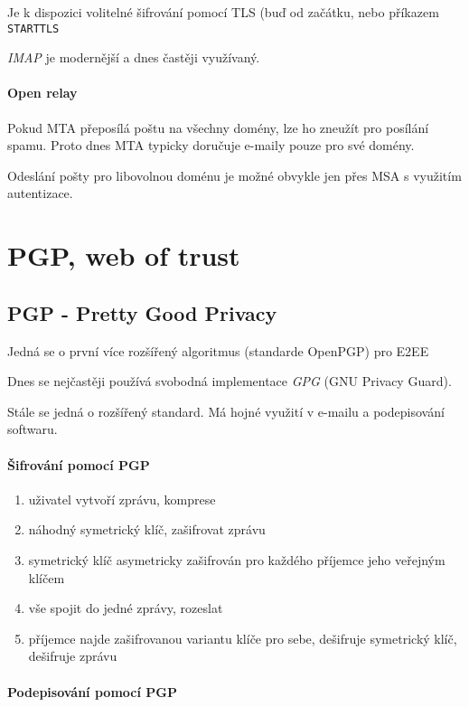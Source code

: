 \documentclass[10pt,a4paper]{article}
\begin{document}
Je k dispozici volitelné šifrování pomocí TLS (buď od začátku, nebo příkazem \texttt{STARTTLS}

\textit{IMAP} je modernější a dnes častěji využívaný.

\paragraph{Open relay}

Pokud MTA přeposílá poštu na všechny domény, lze ho zneužít pro posílání spamu.
Proto dnes MTA typicky doručuje e-maily pouze pro své domény.

Odeslání pošty pro libovolnou doménu je možné obvykle jen přes MSA s využitím autentizace.

\section{PGP, web of trust}

\subsection{PGP - Pretty Good Privacy}

Jedná se o první více rozšířený algoritmus (standarde OpenPGP) pro E2EE

Dnes se nejčastěji používá svobodná implementace \textit{GPG} (GNU Privacy Guard).

Stále se jedná o rozšířený standard. Má hojné využití v e-mailu a podepisování softwaru.

\paragraph{Šifrování pomocí PGP}
\begin{enumerate}\setlength\itemsep{0em}
	\item uživatel vytvoří zprávu, komprese
	\item náhodný symetrický klíč, zašifrovat zprávu
	\item symetrický klíč asymetricky zašifrován pro každého příjemce jeho veřejným klíčem
	\item vše spojit do jedné zprávy, rozeslat
	\item příjemce najde zašifrovanou variantu klíče pro sebe, dešifruje symetrický klíč, dešifruje zprávu
\end{enumerate}

\paragraph{Podepisování pomocí PGP}
\end{document}
